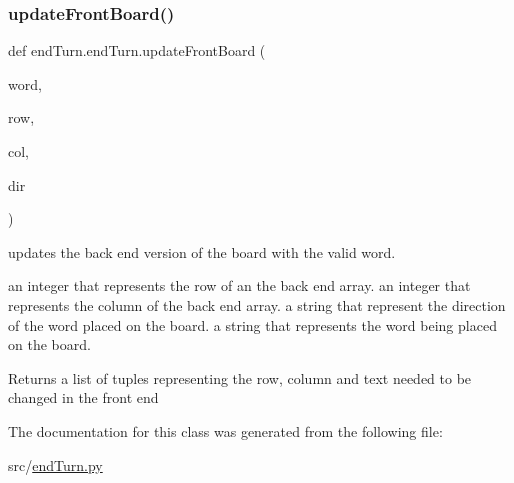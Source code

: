 \subsubsection{\texorpdfstring{update\+Front\+Board()}{updateFrontBoard()}}
{\footnotesize\ttfamily def end\+Turn.\+end\+Turn.\+update\+Front\+Board (\begin{DoxyParamCaption}\item[{}]{word,  }\item[{}]{row,  }\item[{}]{col,  }\item[{}]{dir }\end{DoxyParamCaption})}



updates the back end version of the board with the valid word. 

an integer that represents the row of an the back end array.  an integer that represents the column of the back end array.  a string that represent the direction of the word placed on the board.  a string that represents the word being placed on the board. \begin{DoxyReturn}{Returns}
a list of tuples representing the row, column and text needed to be changed in the front end 
\end{DoxyReturn}


The documentation for this class was generated from the following file\+:\begin{DoxyCompactItemize}
\item 
src/\hyperlink{end_turn_8py}{end\+Turn.\+py}\end{DoxyCompactItemize}
